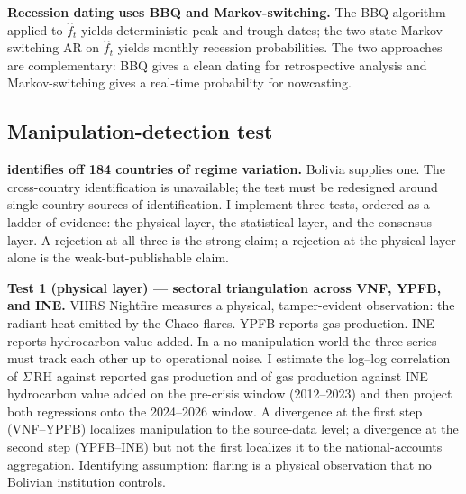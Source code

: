 \documentclass[11pt,letterpaper]{article}
\newcommand{\claim}[1]{\textbf{#1.}}
\begin{document}
\claim{Recession dating uses BBQ and Markov-switching} The \citet{harding_pagan2002} BBQ algorithm applied to $\hat{f}_t$ yields deterministic peak and trough dates; the \citet{hamilton1989} two-state Markov-switching AR on $\hat{f}_t$ yields monthly recession probabilities. The two approaches are complementary: BBQ gives a clean dating for retrospective analysis and Markov-switching gives a real-time probability for nowcasting.

\subsection{Manipulation-detection test}

\claim{\citet{martinez2022} identifies off 184 countries of regime variation} Bolivia supplies one. The cross-country identification is unavailable; the test must be redesigned around single-country sources of identification. I implement three tests, ordered as a ladder of evidence: the physical layer, the statistical layer, and the consensus layer. A rejection at all three is the strong claim; a rejection at the physical layer alone is the weak-but-publishable claim.

\claim{Test 1 (physical layer) --- sectoral triangulation across VNF, YPFB, and INE} VIIRS Nightfire measures a physical, tamper-evident observation: the radiant heat emitted by the Chaco flares. YPFB reports gas production. INE reports hydrocarbon value added. In a no-manipulation world the three series must track each other up to operational noise. I estimate the log--log correlation of $\Sigma\,\mathrm{RH}$ against reported gas production and of gas production against INE hydrocarbon value added on the pre-crisis window (\numrange{2012}{2023}) and then project both regressions onto the 2024--2026 window. A divergence at the first step (VNF--YPFB) localizes manipulation to the source-data level; a divergence at the second step (YPFB--INE) but not the first localizes it to the national-accounts aggregation. Identifying assumption: flaring is a physical observation that no Bolivian institution controls.
\end{document}
